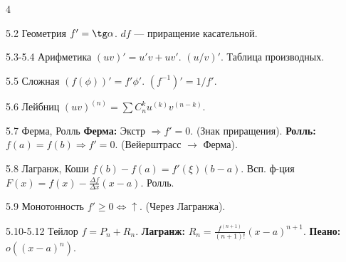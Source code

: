 \documentclass[8pt, a4paper, landscape]{extarticle}
\newcommand{\Ra}{\Rightarrow}
\begin{document}
\begin{multicols*}{4}
\begin{ticket}{5.2 Геометрия}
$f' = \tg \alpha$. $df$ — приращение касательной.
\end{ticket}

\begin{ticket}{5.3-5.4 Арифметика}
$(uv)' = u'v+uv'$. $(u/v)'$. Таблица производных.
\end{ticket}

\begin{ticket}{5.5 Сложная}
$(f(\phi))' = f' \phi'$. $(f^{-1})' = 1/f'$.
\end{ticket}

\begin{ticket}{5.6 Лейбниц}
$(uv)^{(n)} = \sum C_n^k u^{(k)} v^{(n-k)}$.
\end{ticket}

\begin{ticket}{5.7 Ферма, Ролль}
\textbf{Ферма:} Экстр $\Ra f'=0$. (Знак приращения).
\textbf{Ролль:} $f(a)=f(b) \Ra f'=0$. (Вейерштрасс $\to$ Ферма).
\end{ticket}

\begin{ticket}{5.8 Лагранж, Коши}
$f(b)-f(a) = f'(\xi)(b-a)$.
Всп. ф-ция $F(x) = f(x) - \frac{\Delta f}{\Delta x} (x-a)$. Ролль.
\end{ticket}

\begin{ticket}{5.9 Монотонность}
$f' \ge 0 \iff \uparrow$. (Через Лагранжа).
\end{ticket}

\begin{ticket}{5.10-5.12 Тейлор}
$f = P_n + R_n$.
\textbf{Лагранж:} $R_n = \frac{f^{(n+1)}}{(n+1)!} (x-a)^{n+1}$.
\textbf{Пеано:} $o((x-a)^n)$.
\end{ticket}

\end{multicols*}
\end{document}
